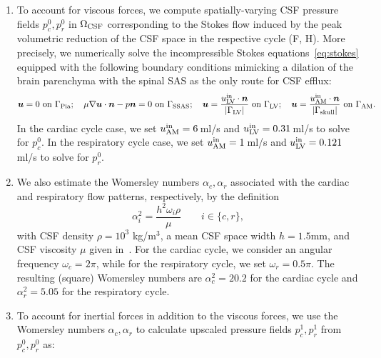 \begin{enumerate}[label=\roman*)]
\item
  To account for viscous forces, we compute spatially-varying CSF
  pressure fields $p^0_c, p^0_r$ in $\Omega_{\rm CSF}$ corresponding
  to the Stokes flow induced by the peak volumetric reduction of the
  CSF space in the respective cycle (F, H). More
  precisely, we numerically solve the incompressible Stokes
  equations~\eqref{eq:stokes} equipped with the following boundary
  conditions mimicking a dilation of the brain parenchyma with the
  spinal SAS as the only route for CSF efflux:
  \begin{equation}\label{eq:pulsatility:bcs}
    \bm u = 0 \text{ on } \Gamma_{\rm Pia}; \quad 
    \mu \nabla \bm u \cdot \bm n - p \bm n = 0 \text{ on } \Gamma_{\rm SSAS}; \quad 
    \bm u = \frac{u^{\rm in}_{\rm LV} \cdot \bm n}{|\Gamma_{\rm LV}|} \text{ on } \Gamma_{\rm LV}; \quad
    \bm u = \frac{u^{\rm in}_{\rm AM} \cdot \bm n}{|\Gamma_{\rm skull}|} \text{ on } \Gamma_{\rm AM}.
\end{equation}
  In the cardiac cycle case, we set $u^{\rm in}_{\rm AM} = 6\,$ml/s \cite{causemann2022human,baledent2014imaging} and $u^{\rm in}_{\rm LV}=0.31\,$ml/s \cite{vinje2019respiratory} to solve for $p^0_c$. In the respiratory cycle case, we set $u^{\rm{in}}_{\rm{AM}} = 1\,$ml/s \cite{gutierrez2022effect} and $u^{\rm in}_{\rm{LV}}=0.121\,$ml/s \cite{liu2024using} to solve for $p^0_r$.
\item
  We also estimate the Womersley numbers $\alpha_c, \alpha_r$
  associated with the cardiac and respiratory flow patterns,
  respectively, by the definition
  \begin{equation}
    \alpha^2_i = \frac{h^2 \omega_i \rho}{\mu} \qquad i \in \{c, r\},
  \end{equation}
  with CSF density $\rho = 10^3$ kg/m$^3$, a mean CSF space width $h =
  1.5$mm, and CSF viscosity $\mu$ given in~.  For
  the cardiac cycle, we consider an angular frequency $\omega_c = 2
  \pi$, while for the respiratory cycle, we set $\omega_r = 0.5
  \pi$. The resulting (square) Womersley numbers are $\alpha_c^2 = 20.2$
  for the cardiac cycle and $\alpha_r^2 = 5.05$ for the respiratory
  cycle.
\item
  To account for inertial forces in addition to the viscous forces, we
  use the Womersley numbers $\alpha_c, \alpha_r$ to calculate upscaled
  pressure fields $p^1_c, p^1_r$ from $p^0_c, p^0_r$ as:
  \begin{equation}

\end{equation}
\end{enumerate}
